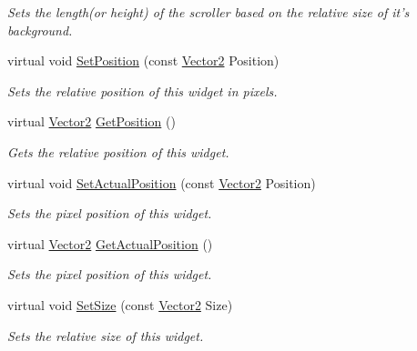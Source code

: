 \begin{DoxyCompactItemize}
\begin{DoxyCompactList}\small\item\em Sets the length(or height) of the scroller based on the relative size of it's background. \item\end{DoxyCompactList}\item 
virtual void \hyperlink{classphys_1_1UI_1_1Scrollbar_a6a61740b90f640463fff1ebe46ca68e9}{SetPosition} (const \hyperlink{classphys_1_1Vector2}{Vector2} Position)
\begin{DoxyCompactList}\small\item\em Sets the relative position of this widget in pixels. \item\end{DoxyCompactList}\item 
virtual \hyperlink{classphys_1_1Vector2}{Vector2} \hyperlink{classphys_1_1UI_1_1Scrollbar_ad049af26ff2247cfcd988cb5639fa003}{GetPosition} ()
\begin{DoxyCompactList}\small\item\em Gets the relative position of this widget. \item\end{DoxyCompactList}\item 
virtual void \hyperlink{classphys_1_1UI_1_1Scrollbar_a6070857488f05d0349b48f249edf813f}{SetActualPosition} (const \hyperlink{classphys_1_1Vector2}{Vector2} Position)
\begin{DoxyCompactList}\small\item\em Sets the pixel position of this widget. \item\end{DoxyCompactList}\item 
virtual \hyperlink{classphys_1_1Vector2}{Vector2} \hyperlink{classphys_1_1UI_1_1Scrollbar_a73337985c0f1f173e253c88705ae5d6e}{GetActualPosition} ()
\begin{DoxyCompactList}\small\item\em Sets the pixel position of this widget. \item\end{DoxyCompactList}\item 
virtual void \hyperlink{classphys_1_1UI_1_1Scrollbar_af4c4061cf2ddeb783ee52acb805f0cfb}{SetSize} (const \hyperlink{classphys_1_1Vector2}{Vector2} Size)
\begin{DoxyCompactList}\small\item\em Sets the relative size of this widget. \item\end{DoxyCompactList}\item 

\end{DoxyCompactItemize}

